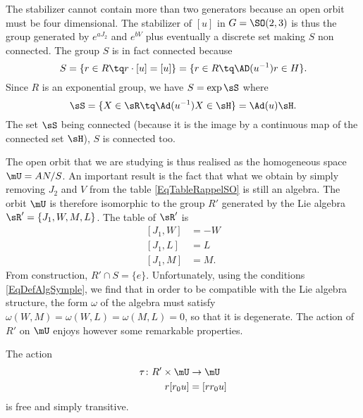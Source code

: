 The stabilizer cannot contain more than two generators because an open orbit must be four dimensional. The stabilizer of $[u]$ in $G=\SO(2,3)$ is thus the group generated by $ e^{aJ_{2}}$ and $ e^{bV}$ plus eventually a discrete set making $S$ non connected.  The group $S$ is in fact connected because
\begin{equation}
	S=\{ r\in R\tq r\cdot[u]=[u] \}
	=\{ r\in R\tq \AD(u^{-1})r\in H \}.
\end{equation}
Since $R$ is an exponential group, we have $S=\exp\sS$ where
\[
	\sS=\{ X\in\sR\tq\Ad(u^{-1})X\in\sH \}=\Ad(u)\sH.
\]
The set $\sS$ being connected (because it is the image by a continuous map of the connected set $\sH$), $S$ is connected too.

The open orbit that we are studying is thus realised as the homogeneous space $\mU=AN/S$. An important result is the fact that what we obtain by simply removing $J_2$ and $V$ from the table \eqref{EqTableRappelSO} is still an algebra. The orbit $\mU$ is therefore isomorphic to the group $R'$ generated by the Lie algebra $\sR'=\{ J_1,W,M,L \}$. The table of $\sR'$ is
\begin{subequations}
	\begin{align}
		[J_{1},W] & =-W \\
		[J_{1},L] & =L  \\
		[J_{1},M] & =M.
	\end{align}
\end{subequations}
From construction, $R'\cap S=\{ e \}$. Unfortunately, using the conditions \eqref{EqDefAlgSymple}, we find that in order to be compatible with the Lie algebra structure, the form $\omega$ of the algebra must satisfy $\omega(W,M)=\omega(W,L)=\omega(M,L)=0$, so that it is degenerate.  The action of $R'$ on $\mU$ enjoys however some remarkable properties.
\begin{proposition}
	The action
	\begin{equation}
		\begin{aligned}
			\tau\colon R'\times \mU & \to \mU   \\
			r[r_0u]                 & = [rr_0u]
		\end{aligned}
	\end{equation}
	is free and simply transitive.
	\label{PropURsimptra}
\end{proposition}

